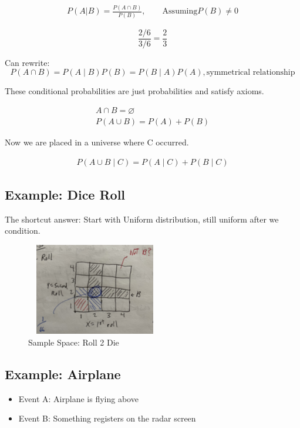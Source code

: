\begin{align}
P(A|B) = \frac{P(A \cap B)}{P(B)}, \qquad \text{Assuming} P(B) \ne 0  
\end{align}

$$
\frac{2/6}{3/6} = \frac{2}{3}
$$

 Can rewrite:
$$
P(A \cap B) = P(A \mid B)P(B) = P(B \mid A)P(A), \text{symmetrical relationship} 
$$

 These conditional probabilities are just probabilities and satisfy axioms.

\begin{align*}
A \cap B = \varnothing\\
P(A \cup B) = P(A) + P(B)
\end{align*}

Now we are placed in a universe where C occurred.

\begin{align*}
P(A \cup B \mid C) = P(A \mid C) + P(B \mid C)
\end{align*}

\subsection{Example: Dice Roll}

 The shortcut answer: Start with Uniform distribution, still uniform after we condition.

\begin{figure}[!ht]
\centering
\includegraphics[width=6cm, height=4cm]{images/L02/dice_roll.jpeg}
\caption{Sample Space: Roll 2 Die}
\end{figure}

\subsection{Example: Airplane}


\begin{itemize}
    \item Event A: Airplane is flying above
    \item Event B: Something registers on the radar screen
\end{itemize}

